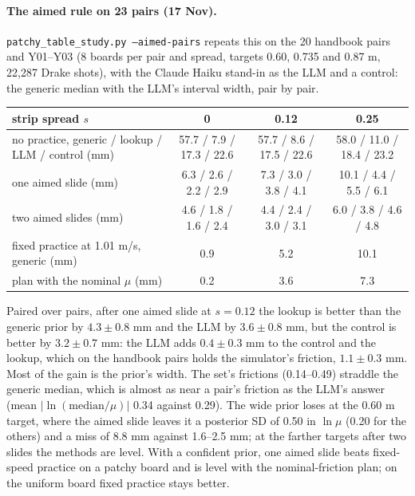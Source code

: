 \documentclass[10pt]{article}
\newcommand{\code}[1]{\texttt{#1}}
\begin{document}
\paragraph{The aimed rule on 23 pairs (17 Nov).}  \code{patchy\_table\_study.py --aimed-pairs} repeats this on the 20
handbook pairs and Y01--Y03 (8 boards per pair and spread, targets 0.60, 0.735 and 0.87 m, 22{,}287 Drake shots), with the
Claude Haiku stand-in as the LLM and a control: the generic median with the LLM's interval width, pair by pair.
\begin{center}\small
\begin{tabular}{@{}lccc@{}}
\toprule
strip spread $s$ & 0 & 0.12 & 0.25\\
\midrule
no practice, generic / lookup / LLM / control (mm) & 57.7 / 7.9 / 17.3 / 22.6 & 57.7 / 8.6 / 17.5 / 22.6 & 58.0 / 11.0 / 18.4 / 23.2\\
one aimed slide (mm) & 6.3 / 2.6 / 2.2 / 2.9 & 7.3 / 3.0 / 3.8 / 4.1 & 10.1 / 4.4 / 5.5 / 6.1\\
two aimed slides (mm) & 4.6 / 1.8 / 1.6 / 2.4 & 4.4 / 2.4 / 3.0 / 3.1 & 6.0 / 3.8 / 4.6 / 4.8\\
fixed practice at 1.01 m/s, generic (mm) & 0.9 & 5.2 & 10.1\\
plan with the nominal $\mu$ (mm) & 0.2 & 3.6 & 7.3\\
\bottomrule
\end{tabular}
\end{center}
Paired over pairs, after one aimed slide at $s=0.12$ the lookup is better than the generic prior by $4.3\pm0.8$ mm and the
LLM by $3.6\pm0.8$ mm, but the control is better by $3.2\pm0.7$ mm: the LLM adds $0.4\pm0.3$ mm to the control and the
lookup, which on the handbook pairs holds the simulator's friction, $1.1\pm0.3$ mm.  Most of the gain is the prior's
width.  The set's frictions (0.14--0.49) straddle the generic median, which is almost as near a pair's friction as the
LLM's answer (mean $|\ln(\text{median}/\mu)|$ 0.34 against 0.29).  The wide prior loses at the 0.60 m target, where the
aimed slide leaves it a posterior SD of 0.50 in $\ln\mu$ (0.20 for the others) and a miss of 8.8 mm against 1.6--2.5 mm; at
the farther targets after two slides the methods are level.  With a confident prior, one aimed slide beats fixed-speed
practice on a patchy board and is level with the nominal-friction plan; on the uniform board fixed practice stays better.

\appendix
\end{document}
